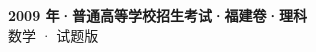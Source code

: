 \documentclass[zihao=-4, a4paper]{ctexart}
\begin{document}
\begin{center}
  {\Large\bfseries 2009 年·普通高等学校招生考试·福建卷·理科}\\[4pt]
  {\large 数学 · 试题版}
\end{center}
\medskip
{}

\end{document}

